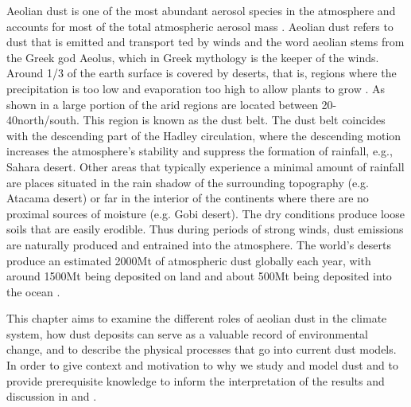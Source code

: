 
\label{chap:dust_roles_models}
Aeolian dust is one of the most abundant aerosol species in the atmosphere and accounts for most of the total atmospheric aerosol mass \parencite{adebiyi2020dust}.
Aeolian dust refers to dust that is emitted and transport
ted by winds and the word aeolian stems from the Greek god Aeolus, which in Greek mythology is the keeper of the winds. 
Around 1/3 of the earth surface is covered by deserts, that is, regions where the precipitation is too low and evaporation too high to allow plants to grow \parencite{williams_climate_2014}.
As shown in  a large portion of the arid regions are located between 20\degree - 40\degree north/south. 
This region is known as the dust belt\parencite{williams_climate_2014}. 
The dust belt coincides with the descending part of the Hadley circulation, where the descending motion increases the atmosphere's stability and suppress the formation of rainfall, e.g., Sahara desert. 
Other areas that typically experience a minimal amount of rainfall are places situated in the rain shadow of the surrounding topography (e.g. Atacama desert) or far in the interior of the continents where there are no proximal sources of moisture (e.g. Gobi desert).  
The dry conditions produce loose soils that are easily erodible. 
Thus during periods of strong winds, dust emissions are naturally produced and entrained into the atmosphere. 
The world's deserts produce an estimated 2000Mt of atmospheric dust globally each year, with around 1500Mt being deposited on land and about 500Mt being deposited into the ocean \parencite{shao2011dust}. 

This chapter aims to examine the different roles of aeolian dust in the climate system, how dust deposits can serve as a valuable record of environmental change, and to describe the physical processes that go into current dust models. In order to give context and motivation to why we study and model dust and to provide prerequisite knowledge to inform the interpretation of the results and discussion in  and .  

